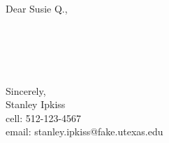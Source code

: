 \pagestyle{CL}
Dear Susie Q.,\\

\lipsum[1]\\

\lipsum[2]\\

\lipsum[3]\\

\lipsum[4]\\

\lipsum[5]\\

Sincerely, \\

Stanley Ipkiss\\
cell: 512-123-4567\\
email: stanley.ipkiss@fake.utexas.edu